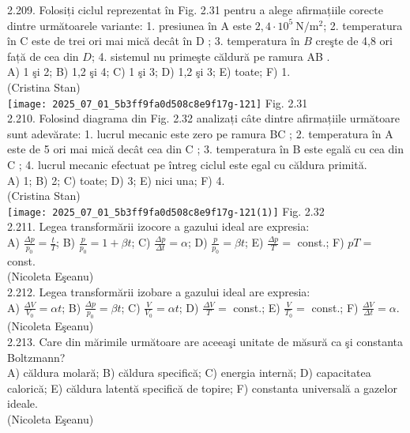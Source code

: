 2.209. Folosiți ciclul reprezentat în Fig. 2.31 pentru a alege afirmațiile corecte dintre următoarele variante: 1. presiunea în A este $2,4 \cdot 10^{5} \mathrm{~N} / \mathrm{m}^{2}$; 2. temperatura în C este de trei ori mai mică decât în D ; 3. temperatura în $B$ creşte de 4,8 ori față de cea din $D$; 4. sistemul nu primeşte căldură pe ramura AB .\\ A) 1 şi 2; B) 1,2 şi 4; C) 1 şi 3; D) 1,2 şi 3; E) toate; F) 1.\\ (Cristina Stan)\\ \texttt{[image: 2025\_07\_01\_5b3ff9fa0d508c8e9f17g-121]} Fig. 2.31\\

2.210. Folosind diagrama din Fig. 2.32 analizați câte dintre afirmațiile următoare sunt adevărate: 1. lucrul mecanic este zero pe ramura BC ; 2. temperatura în A este de 5 ori mai mică decât cea din C ; 3. temperatura în B este egală cu cea din C ; 4. lucrul mecanic efectuat pe întreg ciclul este egal cu căldura primită.\\ A) 1; B) 2; C) toate; D) 3; E) nici una; F) 4.\\ (Cristina Stan)\\ \texttt{[image: 2025\_07\_01\_5b3ff9fa0d508c8e9f17g-121(1)]} Fig. 2.32\\

2.211. Legea transformării izocore a gazului ideal are expresia:\\ A) $\frac{\Delta p}{p_{0}}=\frac{t}{T}$; B) $\frac{p}{p_{0}}=1+\beta t$; C) $\frac{\Delta p}{\Delta t}=\alpha$; D) $\frac{p}{p_{0}}=\beta t$; E) $\frac{\Delta p}{T}=$ const.; F) $p T=$ const.\\ (Nicoleta Eşeanu)\\

2.212. Legea transformării izobare a gazului ideal are expresia:\\ A) $\frac{\Delta V}{V_{0}}=\alpha t$; B) $\frac{\Delta p}{p_{0}}=\beta t$; C) $\frac{V}{V_{0}}=\alpha t$; D) $\frac{\Delta V}{T}=$ const.; E) $\frac{V}{T_{0}}=$ const.; F) $\frac{\Delta V}{\Delta t}=\alpha$.\\ (Nicoleta Eşeanu)\\

2.213. Care din mărimile următoare are aceeaşi unitate de măsură ca şi constanta Boltzmann?\\ A) căldura molară; B) căldura specifică; C) energia internă; D) capacitatea calorică; E) căldura latentă specifică de topire; F) constanta universală a gazelor ideale.\\ (Nicoleta Eşeanu)\\


